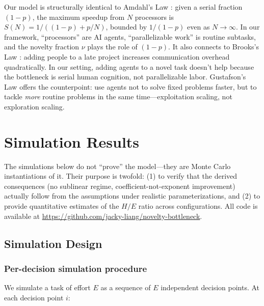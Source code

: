 \documentclass[11pt,a4paper]{article}
\begin{document}
Our model is structurally identical to Amdahl's Law \citep{amdahl1967}: given a serial fraction $(1-p)$, the maximum speedup from $N$ processors is $S(N) = 1/((1-p) + p/N)$, bounded by $1/(1-p)$ even as $N \to \infty$. In our framework, ``processors'' are AI agents, ``parallelizable work'' is routine subtasks, and the novelty fraction $\nu$ plays the role of $(1-p)$. It also connects to Brooks's Law \citep{brooks1975}: adding people to a late project increases communication overhead quadratically. In our setting, adding agents to a novel task doesn't help because the bottleneck is serial human cognition, not parallelizable labor. Gustafson's Law \citep{gustafson1988} offers the counterpoint: use agents not to solve fixed problems faster, but to tackle \emph{more} routine problems in the same time---exploitation scaling, not exploration scaling.

\section{Simulation Results}
\label{sec:simulations}

The simulations below do not ``prove'' the model---they are Monte Carlo instantiations of it. Their purpose is twofold: (1) to verify that the derived consequences (no sublinear regime, coefficient-not-exponent improvement) actually follow from the assumptions under realistic parameterizations, and (2) to provide quantitative estimates of the $H/E$ ratio across configurations. All code is available at \url{https://github.com/jacky-liang/novelty-bottleneck}.

\subsection{Simulation Design}
\label{sec:sim-design}

\subsubsection*{Per-decision simulation procedure}

We simulate a task of effort $E$ as a sequence of $E$ independent decision points. At each decision point $i$:
\end{document}

